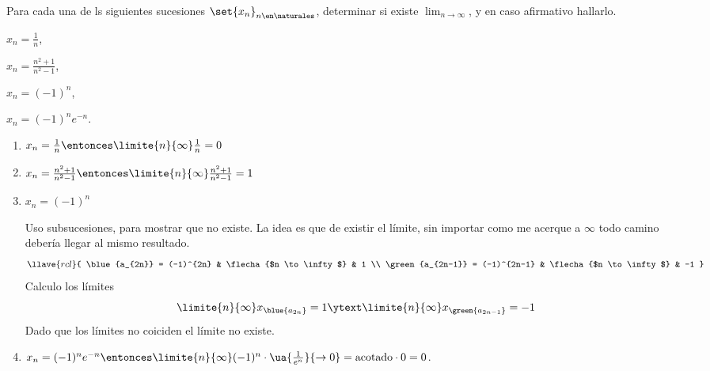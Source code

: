 \begin{enunciado}{\ejercicio}
  Para cada una de ls siguientes sucesiones $\set{x_n}_{n \en \naturales}$, determinar si existe
  $\lim_{n\to \infty}$, y en caso afirmativo hallarlo.
  \begin{enumerate}[label=\alph*)]
    \begin{multicols}{2}
      \item $x_n = \frac{1}{n}$,
      \item $x_n = \frac{n^2 + 1}{n^2 - 1}$,
      \item $x_n = (-1)^n$,
      \item $x_n = (-1)^n e^{-n}$.
    \end{multicols}
  \end{enumerate}
\end{enunciado}

\begin{enumerate}[label=\alph*)]
  \item $x_n = \frac{1}{n}
          \entonces
          \limite{n}{\infty} \frac{1}{n} = 0
        $

  \item $x_n = \frac{n^2 + 1}{n^2 - 1}
          \entonces
          \limite{n}{\infty} \frac{n^2 + 1}{n^2 - 1} = 1
        $

  \item\label{ej12-item-c} $x_n = (-1)^n$

        Uso subsucesiones, para mostrar que no existe. La idea es que de existir el límite, sin importar como me acerque a $\infty$ todo
        camino debería llegar al mismo resultado.
        $$
          \llave{rcl}{
            \blue{a_{2n}} = (-1)^{2n} & \flecha{$n \to \infty$} & 1 \\
            \green{a_{2n-1}} = (-1)^{2n-1} & \flecha{$n \to \infty$} & -1
          }
        $$
        Calculo los límites
        $$
          \limite{n}{\infty} x_{\blue{a_{2n}}} = 1
          \ytext
          \limite{n}{\infty} x_{\green{a_{2n-1}}} = -1
        $$
        Dado que los límites no coiciden el límite no existe.

  \item $x_n = (-1)^n e^{-n}
          \entonces
          \limite{n}{\infty} (-1)^n \cdot \ua{\frac{1}{e^n}}{\to 0} = \text{acotado} \cdot 0 = 0 $.
\end{enumerate}

\begin{aportes}
  \item {}
\end{aportes}

